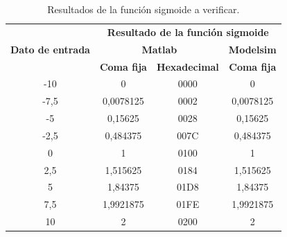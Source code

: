 \begin{table}[h!]
\centering
\caption{Resultados de la función sigmoide a verificar.}
\label{tab:5}
\begin{tabular}{|c|ccc|}
\hline
\multirow{3}{*}{\textbf{Dato de entrada}} & \multicolumn{3}{c|}{\textbf{Resultado de la función sigmoide}}                                           \\ \cline{2-4} 
                                          & \multicolumn{2}{c|}{\textbf{Matlab}}                                                & \textbf{Modelsim}  \\ \cline{2-4} 
                                          & \multicolumn{1}{c|}{\textbf{Coma fija}} & \multicolumn{1}{c|}{\textbf{Hexadecimal}} & \textbf{Coma fija} \\ \hline
-10                                       & \multicolumn{1}{c|}{0}                  & \multicolumn{1}{c|}{0000}                 & 0                  \\ \hline
-7,5                                      & \multicolumn{1}{c|}{0,0078125}          & \multicolumn{1}{c|}{0002}                 & 0,0078125          \\ \hline
-5                                        & \multicolumn{1}{c|}{0,15625}            & \multicolumn{1}{c|}{0028}                 & 0,15625            \\ \hline
-2,5                                      & \multicolumn{1}{c|}{0,484375}           & \multicolumn{1}{c|}{007C}                 & 0,484375           \\ \hline
0                                         & \multicolumn{1}{c|}{1}                  & \multicolumn{1}{c|}{0100}                 & 1                  \\ \hline
2,5                                       & \multicolumn{1}{c|}{1,515625}           & \multicolumn{1}{c|}{0184}                 & 1,515625           \\ \hline
5                                         & \multicolumn{1}{c|}{1,84375}            & \multicolumn{1}{c|}{01D8}                 & 1,84375            \\ \hline
7,5                                       & \multicolumn{1}{c|}{1,9921875}          & \multicolumn{1}{c|}{01FE}                 & 1,9921875          \\ \hline
10                                        & \multicolumn{1}{c|}{2}                  & \multicolumn{1}{c|}{0200}                 & 2                  \\ \hline
\end{tabular}
\end{table}

